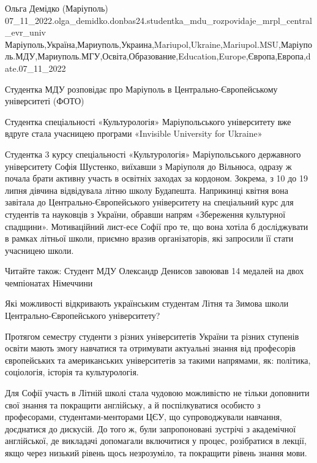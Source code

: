 
 
 
 
 

Ольга Демідко (Маріуполь)
07_11_2022.olga_demidko.donbas24.studentka_mdu_rozpovidaje_mrpl_central_evr_univ
Маріуполь,Україна,Мариуполь,Украина,Mariupol,Ukraine,Mariupol.MSU,Маріуполь.МДУ,Мариуполь.МГУ,Освіта,Образование,Education,Europe,Європа,Европа,date.07_11_2022

Студентка МДУ розповідає про Маріуполь в Центрально-Європейському університеті
(ФОТО)

Студентка спеціальності «Культурологія» Маріупольського університету вже вдруге
стала учасницею програми «Invisible University for Ukraine»

Студентка 3 курсу спеціальності «Культурологія» Маріупольського державного
університету Софія Шустенко, виїхавши з Маріуполя до Вільнюса, одразу ж почала
брати активну участь в освітніх заходах за кордоном. Зокрема, з 10 до 19 липня
дівчина відвідувала літню школу Будапешта. Наприкинці квітня вона завітала до
Центрально-Європейського університету на спеціальний курс для студентів та
науковців з України, обравши напрям «Збереження культурної спадщини».
Мотиваційний лист-есе Софії про те, що вона хотіла б досліджувати в рамках
літньої школи, приємно вразив організаторів, які запросили її стати учасницею
школи.

Читайте також: Студент МДУ Олександр Денисов завоював 14 медалей на двох
чемпіонатах Німеччини

Які можливості відкривають українським студентам Літня та Зимова школи
Центрально-Європейського університету?

Протягом семестру студенти з різних університетів України та різних ступенів
освіти мають змогу навчатися та отримувати актуальні знання від професорів
європейських та американських університетів за такими напрямами, як: політика,
соціологія, історія та культурологія.

Для Софії участь в Літній школі стала чудовою можливістю не тільки доповнити
свої знання та покращити англійську, а й поспілкуватися особисто з професорами,
студентами-менторами ЦЄУ, що супроводжували навчання, доєднатися до дискусій.
До того ж, були запропоновані зустрічі з академічної англійської, де викладачі
допомагали включитися у процес, розібратися в лекції, якщо через низький рівень
щось незрозуміло, та покращити рівень знання мови.

